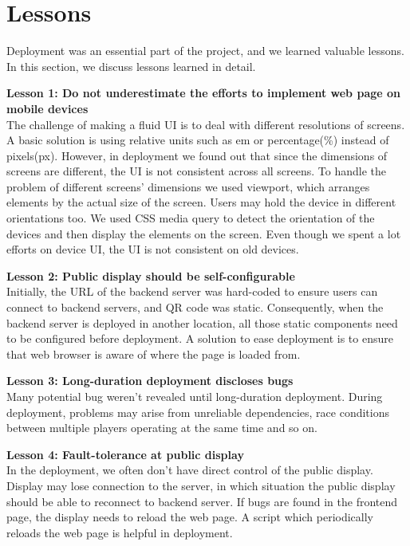 \documentclass{sig-alternate}
\begin{document}
\section{Lessons}

Deployment was an essential part of the project\cite{storz:deployment_lessons}, and we learned valuable lessons.
In this section, we discuss lessons learned in detail.

\textbf{Lesson 1: Do not underestimate the efforts to implement web page on mobile devices}\\
The challenge of making a fluid UI is to deal with different resolutions of 
screens. A basic solution is using relative units such as em or percentage(\%) 
instead of pixels(px). However, in deployment we found out that since the 
dimensions of screens are different, the UI is not consistent across 
all screens. To handle the problem of different screens' dimensions we used 
viewport, which arranges elements by the actual size of the screen. Users 
may hold the device in different orientations too. We used CSS media query 
to detect the orientation of the devices and then display the elements on
 the screen. Even though we spent a lot efforts on device UI, the UI is not 
 consistent on old devices.
 
\textbf{Lesson 2: Public display should be self-configurable}\\
Initially, the URL of the backend 
server was hard-coded to ensure users can connect to backend servers, and QR code was static. Consequently, when the backend server is 
deployed in another location, all those static components need to be configured 
before deployment. A solution to ease deployment is to ensure 
that web browser is aware of where the page is loaded from.

\textbf{Lesson 3: Long-duration deployment discloses bugs}\\
Many potential bug weren't revealed until 
long-duration deployment. During deployment, problems may arise from 
unreliable dependencies, race conditions between multiple players operating 
at the same time and so on.

\textbf{Lesson 4: Fault-tolerance at public display}\\
In the deployment, we often don't have
direct control of the public display. Display may lose connection to
the server, in which situation the public display should be able to reconnect to 
backend server. If bugs are found in the frontend page, the display needs to 
reload the web page. A script which periodically reloads the web page is helpful 
in deployment.
\end{document}
